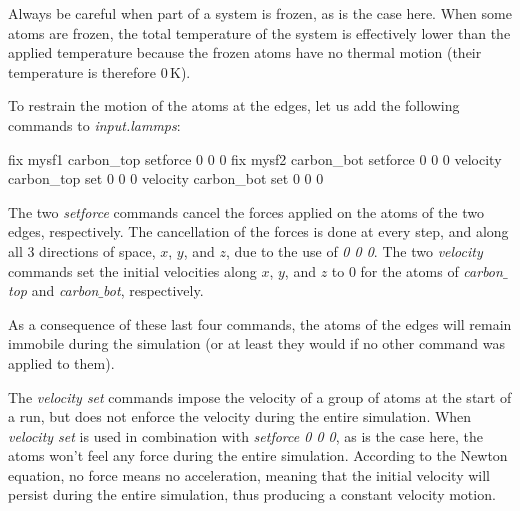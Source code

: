 \begin{tcolorbox}[colback=mylightblue!5!white,colframe=mylightblue!75!black,title=Deal with semi-frozen system]

\vspace{0.25cm} \noindent Always be careful when part of a system is frozen,
as is the case here. When some atoms are frozen, the total temperature
of the system is effectively lower than the applied temperature
because the frozen atoms have no thermal motion (their temperature
is therefore $0\,\text{K}$). 
\end{tcolorbox}

\noindent To restrain the motion of the atoms at the edges, let us add the
following commands to \textit{input.lammps}:

\begin{lcverbatim}
fix mysf1 carbon_top setforce 0 0 0
fix mysf2 carbon_bot setforce 0 0 0
velocity carbon_top set 0 0 0
velocity carbon_bot set 0 0 0
\end{lcverbatim}

\noindent The two \textit{setforce} commands cancel the forces applied on the
atoms of the two edges, respectively. The cancellation of the forces
is done at every step, and along all 3 directions of space, $x$, $y$,
and $z$, due to the use of \textit{0 0 0}. The two \textit{velocity} commands
set the initial velocities along $x$,
$y$, and $z$ to 0 for the atoms of \textit{carbon$\_$top}
and \textit{carbon$\_$bot}, respectively. 

\vspace{0.25cm} \noindent As a consequence of these last four commands, the atoms of the edges will remain
immobile during the simulation (or at least they would if no other command was
applied to them).

\begin{tcolorbox}[colback=mylightblue!5!white,colframe=mylightblue!75!black,title=On imposing a constant velocity to a system]

\vspace{0.25cm} \noindent The \textit{velocity set} commands impose the velocity of a group of atoms at the start of 
a run, but does not enforce the velocity during the entire simulation. 
When \textit{velocity set} is used in combination with \textit{setforce 0 0 0}, 
as is the case here, the atoms
won't feel any force during the entire simulation. According to the Newton equation,
no force means no acceleration, meaning that the initial velocity will persist
during the entire simulation, thus producing a constant velocity motion.
\end{tcolorbox}

